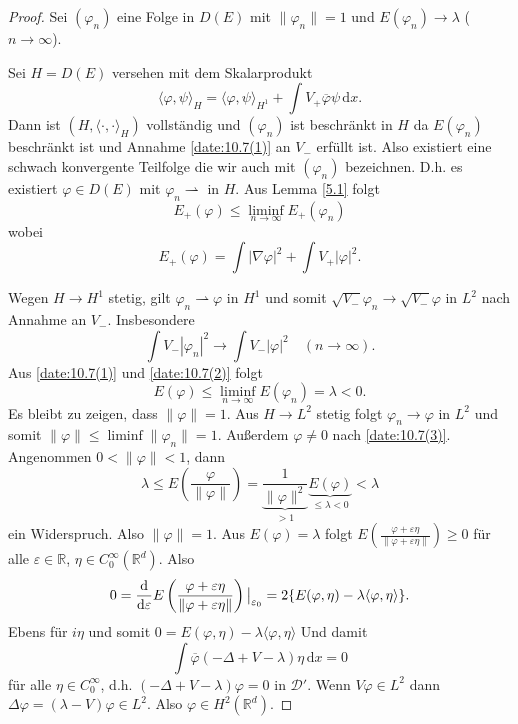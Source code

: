 \documentclass[
paper=a4,
bibtotocnumbered,
liststotocnumbered,
tablecaptionabove,
pointlessnumbers,
twoside,
openright,
10pt
]
{report}
\let\Re\relax\let\Im\relax
\DeclareMathOperator{\Re}{Re}
\DeclareMathOperator{\Im}{Im}
\let\phi\varphi
\theoremstyle{definition}
\numberwithin{equation}{chapter}
\begin{document}
\begin{proof}
Sei $(\phi_n)$ eine Folge in $D(E)$ mit $\| \phi_n\|=1$ und $E(\phi_n) \to \lambda$ ($n\to \infty$).

Sei $H= D(E)$ versehen mit dem Skalarprodukt
\begin{equation}
\langle \phi, \psi\rangle_{H} = \langle \phi, \psi\rangle_{H^1} + \int V_+ \overline{\phi} \psi \, \mathrm dx.
\end{equation}
Dann ist $(H, \langle \cdot, \cdot \rangle_H)$ vollständig und $(\phi_n)$ ist beschränkt in $H$ da $E(\phi_n)$ beschränkt ist und Annahme \eqref{date:10.7(1)} an $V_-$ erfüllt ist. Also existiert eine schwach konvergente Teilfolge die wir auch mit $(\phi_n)$ bezeichnen. D.h. es existiert $\phi \in D(E)$ mit $\phi_n \rightharpoonup$ in $H$. Aus Lemma \ref{5.1} folgt
\begin{equation}
E_+ (\phi) \le \liminf_{n\to \infty} E_+ (\phi_n)
\end{equation}
wobei 
\begin{equation}
E_+(\phi) = \int|\nabla \phi|^2 + \int V_+ |\phi|^2.
\end{equation}

Wegen $H\to H^1$ stetig, gilt $\phi_n \rightharpoonup \phi$ in $H^1$ und somit $\sqrt{V_-} \phi_n \to \sqrt{V_-} \phi$ in $L^2$ nach Annahme an $V_-$. Insbesondere
\begin{equation}\label{date:10.7(2)}
\int V_- |\phi_n|^2\to \int V_- |\phi|^2 \quad (n\to \infty).
\end{equation}
Aus \eqref{date:10.7(1)} und \eqref{date:10.7(2)} folgt
\begin{equation}\label{date:10.7(3)}
E(\phi) \le \liminf_{n\to \infty} E(\phi_n) = \lambda <0.
\end{equation}
Es bleibt zu zeigen, dass $\| \phi\| =1$. Aus $H\to L^2$ stetig folgt $\phi_n \to \phi$ in $L^2$ und somit $\| \phi\| \le \liminf \|\phi_n \|=1$. Außerdem $\phi \neq 0$ nach \eqref{date:10.7(3)}. Angenommen $0 <\|\phi\|<1$, dann
\begin{equation}
\lambda \le E(\frac{\phi}{\|\phi\|} ) = \underbrace{\frac{1}{\|\phi\|^2}}_{>1} \underbrace{E(\phi)}_{\le \lambda <0} <\lambda
\end{equation}
ein Widerspruch. Also $\| \phi\|=1$. Aus $E(\phi) = \lambda$ folgt $E(\frac{\phi+ \varepsilon \eta}{\| \phi + \varepsilon \eta\|})\ge 0$ für alle $\varepsilon \in \mathbb R$, $\eta \in C_0^\infty(\mathbb R^d)$. Also
\begin{equation}
0 = \frac{\mathrm d}{\mathrm d\varepsilon} E\left ( \frac{\phi+ \varepsilon \eta}{\| \phi + \varepsilon \eta\|} \right ) \big |_{\varepsilon_0} = 2\Re\{E(\phi, \eta) - \lambda \langle \phi, \eta\rangle \}.
\end{equation}
Ebens für $i\eta$ und somit $0 = E(\phi, \eta) - \lambda \langle \phi, \eta\rangle$
Und damit 
\begin{equation}
\int \overline{\phi} (-\Delta + V- \lambda) \eta \, \mathrm dx =0
\end{equation}
für alle $\eta \in C_0^\infty$, d.h. $(-\Delta + V- \lambda) \phi=0$ in $\mathcal D'$. Wenn $V\phi \in L^2$ dann $\Delta \phi = (\lambda- V) \phi \in L^2$. Also $\phi \in H^2(\mathbb R^d)$.
\end{proof}
\end{document}
